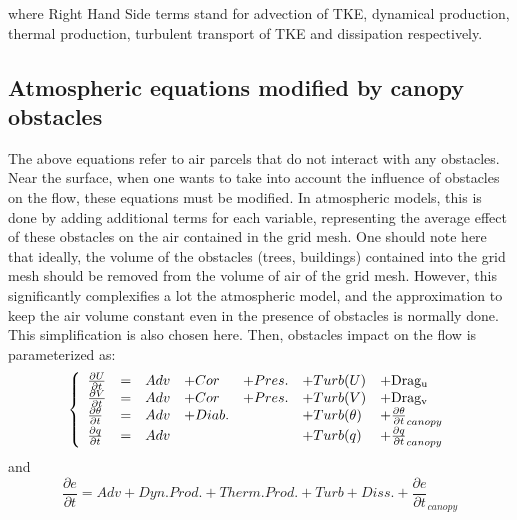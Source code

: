 where Right Hand Side terms stand for advection of TKE, dynamical production, thermal production, turbulent transport of TKE and dissipation respectively. \\

\subsection{Atmospheric equations modified by canopy obstacles}

The above equations refer to air parcels that do not interact with any obstacles. Near the surface, when one wants to take into account the influence of obstacles on the flow, these equations must be modified. In atmospheric models, this is done by adding additional terms for each variable, representing the average effect of these obstacles on the air contained in the grid mesh. One should note here that ideally, the volume of the obstacles (trees, buildings) contained into the grid mesh should be removed from the volume of air of the grid mesh. However, this significantly complexifies a lot the atmospheric model, and the approximation to keep the air volume constant even in the presence of obstacles is normally done. This simplification is also chosen here. Then, obstacles impact on the flow is parameterized as:\\

\begin{equation}
\left\{
\begin{array}{lllllll}
\frac{\partial U}{\partial t} &=&Adv& + Cor & + Pres.& + Turb(U) & + {\rm Drag_u} \\
\frac{\partial V}{\partial t} &=&Adv& + Cor& + Pres. & + Turb(V) & + {\rm Drag_v}\\
\frac{\partial \theta}{\partial t} &=&Adv& + Diab.  &&  + Turb(\theta) & + \frac{\partial \theta}{\partial t}_{canopy}\\
\frac{\partial q}{\partial t} &=&Adv&  && + Turb(q) & + \frac{\partial q}{\partial t}_{canopy} \\
\end{array}
\right.
\label{eq_complete}
\end{equation}
and 
\begin{equation}
\frac{\partial e}{\partial t} =Adv + Dyn. Prod. + Therm. Prod. + Turb  + Diss. + \frac{\partial e}{\partial t}_{canopy}
\end{equation}

